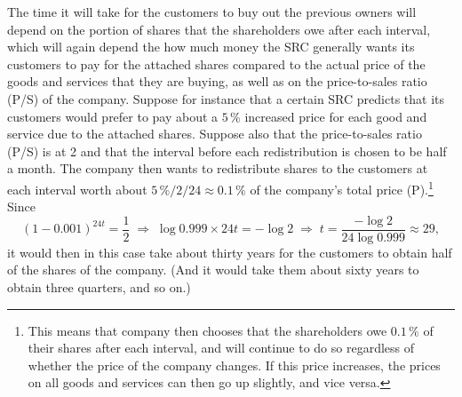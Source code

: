 \documentclass{article}
\begin{document}
The time it will take for the customers to buy out the previous owners will depend on the portion of shares that the shareholders owe after each interval, which will again depend the how much money the SRC generally wants its customers to pay for the attached shares compared to the actual price of the goods and services that they are buying, as well as on the price-to-sales ratio (P/S) of the company. Suppose for instance that a certain SRC predicts that its customers would prefer to pay about a $5\, \%$ increased price for each good and service due to the attached shares. Suppose also that the price-to-sales ratio (P/S) is at 2 and that the interval before each redistribution is chosen to be half a month. The company then wants to redistribute shares to the customers at each interval worth about $5\, \% / 2 / 24 \approx 0.1\, \%$ of the company's total price (P).\footnote{
	This means that company then chooses that the shareholders owe $0.1\, \%$ of their shares after each interval, and will continue to do so regardless of whether the price of the company changes. 
	If this price increases, the prices on all goods and services can then go up slightly, and vice versa.
} 
Since
\[
	(1 - 0.001)^{24 t} = \frac{1}{2} 
	\;\Rightarrow\; 
	\log 0.999 \times 24 t = -\log 2 
	\;\Rightarrow\; 
	t = \frac{-\log 2}{24 \log 0.999} \approx 29,
\]
it would then in this case take about thirty years for the customers to obtain half of the shares of the company. (And it would take them about sixty years to obtain three quarters, and so on.)

\end{document}
